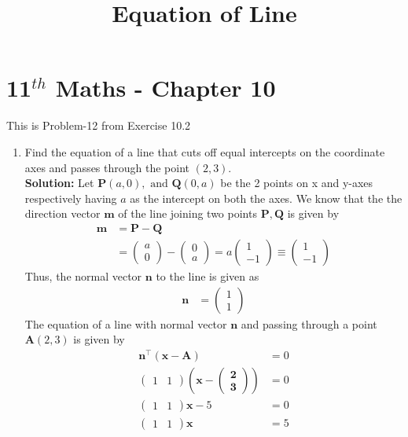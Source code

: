 \documentclass[12pt]{article}
\providecommand{\brak}[1]{\ensuremath{\left(#1\right)}}
\newcommand{\solution}{\noindent \textbf{Solution: }}
\newcommand{\myvec}[1]{\ensuremath{\begin{pmatrix}#1\end{pmatrix}}}
\let\vec\mathbf
\begin{document}
\begin{center}
\title{\textbf{Equation  of Line}}
\date{\vspace{-5ex}} %
\maketitle
\end{center}
\setcounter{page}{1}

\section{11$^{th}$ Maths - Chapter 10}
This is Problem-12 from Exercise 10.2
\begin{enumerate}
		\fi
\item Find the equation of a line that cuts off equal intercepts on the coordinate axes and passes through the point $(2,3)$.  
	\\
\solution 
Let $\vec{P}(a,0), \text{ and } \vec{Q}(0,a)$ be the 2 points on x and y-axes respectively having $a$ as the intercept on both the axes. We know that the the direction vector $\vec{m}$ of the line joining two points $\vec{P}, \vec{Q}$ is given by  
\begin{align}
\vec{m} &=   \vec{P} - \vec{Q} \\
        &=   \myvec{
		a \\
		0 
		} - \myvec{
		   0 \\
		   a
		}  = a\myvec{ 
                     1 \\
		   -1 
        		}  \equiv \myvec{
                           1 \\
			   -1 
		         } 
\end{align}
Thus, the normal vector $\vec{n}$ to the line is given as
\begin{align}
\vec{n} &=  \myvec{
		     1 \\
		     1
	     } 
\end{align}
The equation of a line with normal vector $\vec{n}$ and passing through a point $\vec{A}(2,3)$ is given by
\begin{align}
	\vec{n}^\top\brak{\vec{x}-\vec{A}} &= 0 \\
	\myvec { 1 & 1 } \brak{ \vec{ x  - \myvec{ 2 \\
                                   3
			     }
		}}  &= 0  \\
	\myvec{ 1 & 1} \vec{x} -5 &= 0 \\
        \label{eq:11/10/2/12/1}
	\myvec{ 1 & 1} \vec{x}  &= 5 

\end{align}
\end{enumerate}
\end{document}
